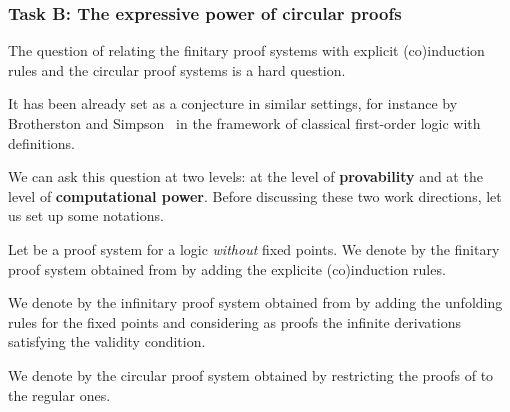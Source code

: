 \subsubsection{Task B: The expressive power of circular proofs}


The question of relating the finitary proof systems with explicit (co)induction rules and the circular proof systems is a hard question.

It has been already set as a conjecture in similar settings, for instance
by Brotherston and Simpson~\cite{BrotherstonS07} in the framework of classical first-order logic with definitions.  


We can ask this question at two levels: at the level of \textbf{provability}
and at the level of \textbf{computational power}.  Before discussing these two work directions,
let us set up some notations.

\begin{notation}
  Let \Sys be a proof system for a logic \textit{without} fixed points.
  We denote by \muS the finitary proof system obtained from \Sys by adding
  the explicite (co)induction rules.

  We denote by \muSi the infinitary proof system obtained from \Sys by adding
  the unfolding rules for the fixed points and considering as proofs the
  infinite derivations satisfying the validity condition.

  We denote by \muSo the circular proof system obtained by restricting
  the proofs of \muSi to the regular ones. 
\end{notation}

